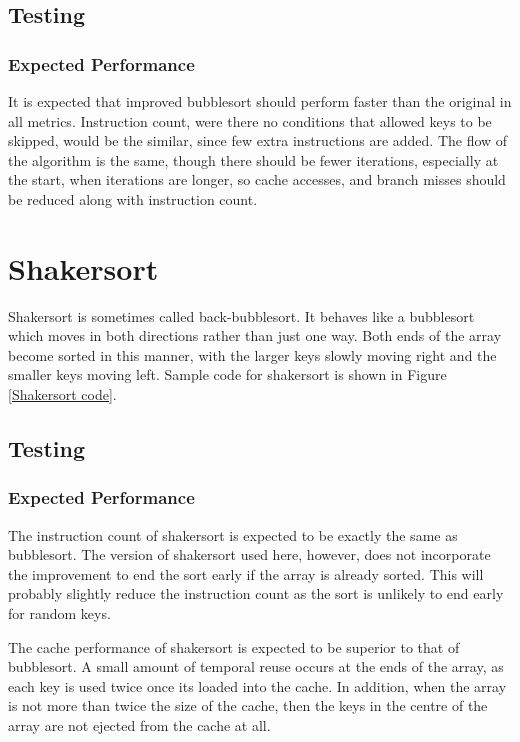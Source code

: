\subsection{Testing}
\subsubsection{Expected Performance}
It is expected that improved bubblesort should perform faster than the original
in all metrics. Instruction count, were there no conditions that allowed keys to
be skipped, would be the similar, since few extra instructions are added. The
flow of the algorithm is the same, though there should be fewer iterations,
especially at the start, when iterations are longer, so cache accesses, and
branch misses should be reduced along with instruction count.

\section{Shakersort}
Shakersort is sometimes called back-bubblesort. It behaves like a bubblesort
which moves in both directions rather than just one way. Both ends of the array
become sorted in this manner, with the larger keys slowly moving right and the
smaller keys moving left. Sample code for shakersort is shown in Figure
\vref{Shakersort code}.

\subsection{Testing}
\subsubsection{Expected Performance}
The instruction count of shakersort is expected to be exactly the same as
bubblesort. The version of shakersort used here, however, does not incorporate
the improvement to end the sort early if the array is already sorted. This will
probably slightly reduce the instruction count as the sort is unlikely to end
early for random keys. 

The cache performance of shakersort is expected to be superior to that of
bubblesort. A small amount of temporal reuse occurs at the ends of the array,
as each key is used twice once its loaded into the cache. In addition, when the
array is not more than twice the size of the cache, then the keys in the centre
of the array are not ejected from the cache at all.

